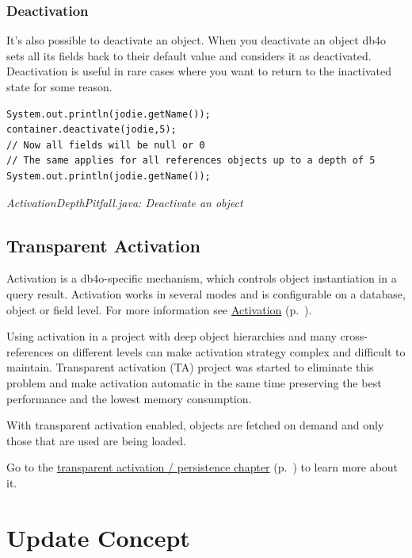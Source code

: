 \subsubsection*{Deactivation}

It's also possible to deactivate an object. When you deactivate an object db4o sets all its fields back to their default value and considers it as deactivated. Deactivation is useful in rare cases where you want to return to the inactivated state for some reason.

\begin{lstlisting}
System.out.println(jodie.getName());
container.deactivate(jodie,5);
// Now all fields will be null or 0
// The same applies for all references objects up to a depth of 5
System.out.println(jodie.getName());
\end{lstlisting}

{\small\itshape ActivationDepthPitfall.java: Deactivate an object\par}
\medskip

\subsection{Transparent Activation}
\label{ref:basics-activation-concept-transparent-activation-framework}

Activation is a db4o-specific mechanism, which controls object instantiation in a query result. Activation works in several modes and is configurable on a database, object or field level. For more information see \hyperref[ref:basics-activation]{Activation} (p.~\pageref{ref:basics-activation}).

Using activation in a project with deep object hierarchies and many cross-references on different levels can make activation strategy complex and difficult to maintain. Transparent activation (TA) project was started to eliminate this problem and make activation automatic in the same time preserving the best performance and the lowest memory consumption.

With transparent activation enabled, objects are fetched on demand and only those that are used are being loaded.

Go to the \hyperref[ref:basics-transparent-persistence]{transparent activation / persistence chapter} (p.~\pageref{ref:basics-transparent-persistence}) to learn more about it.

\section{Update Concept}
\label{ref:basics-update-concept}

